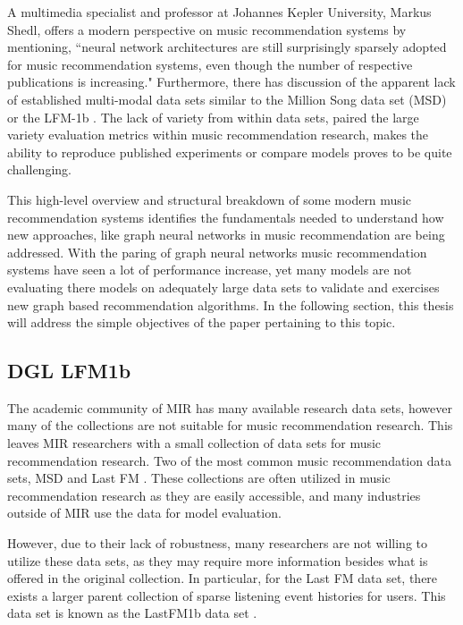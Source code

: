 A multimedia specialist and professor at Johannes Kepler University, Markus Shedl, offers a modern perspective on music recommendation systems by mentioning, “neural network architectures are still surprisingly sparsely adopted for music recommendation systems, even though the number of respective publications is increasing." \cite{Schedl2022} Furthermore, there has discussion of the apparent lack of established multi-modal data sets similar to the Million Song data set (MSD) \cite{bertin2011million} or the LFM-1b \cite{Schedl2016}. The lack of variety from within data sets, paired the large variety evaluation metrics within music recommendation research, makes the ability to reproduce published experiments or compare models proves to be quite challenging.

This high-level overview and structural breakdown of some modern music recommendation systems identifies the fundamentals needed to understand how new approaches, like graph neural networks in music recommendation are being addressed. With the paring of graph neural networks music recommendation systems have seen a lot of performance increase, yet many models are not evaluating there models on adequately large data sets to validate and exercises new graph based recommendation algorithms. In the following section, this thesis will address the simple objectives of the paper pertaining to this topic.

\subsection{DGL LFM1b}
The academic community of MIR has many available research data sets, however many of the collections are not suitable for music recommendation research. This leaves MIR researchers with a small collection of data sets for music recommendation research. Two of the most common music recommendation data sets, MSD \cite{bertin2011million} and Last FM \cite{dieleman2011audio}. These collections are often utilized in music recommendation research as they are easily accessible, and many industries outside of MIR  use the data for model evaluation. 

However, due to their lack of robustness, many researchers are not willing to utilize these data sets, as they may require more information besides what is offered in the original collection. In particular, for the Last FM data set, there exists a larger parent collection of sparse listening event histories for users. This data set is known as the LastFM1b data set \cite{Schedl2016}.

